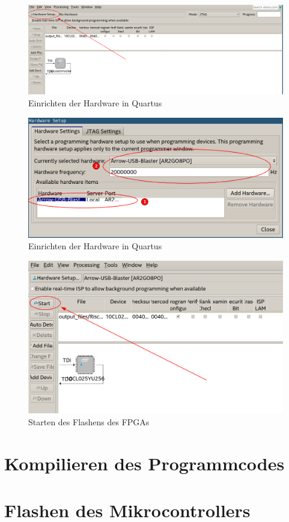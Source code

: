     \begin{figure}[H]
        \centering
        \includegraphics[scale=0.6]{img/quartus_programmer_select_hardware.png}
        \caption{Einrichten der Hardware in Quartus}
        \label{fig:quartus_programmer_window}
    \end{figure}

    \begin{figure}[H]
        \centering
        \includegraphics[scale=0.6]{img/quartus_programmer_select_hardware2.png}
        \caption{Einrichten der Hardware in Quartus}
        \label{fig:quartus_programmer_select_hardware}
    \end{figure}

    \begin{figure}[H]
        \centering
        \includegraphics[scale=0.6]{img/quartus_programmer_start.png}
        \caption{Starten des Flashens des FPGAs}
        \label{fig:quartus_programmer_start}
    \end{figure}


    \section{Kompilieren des Programmcodes}
    \section{Flashen des Mikrocontrollers}

